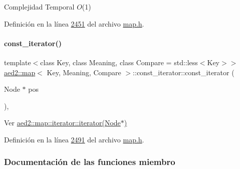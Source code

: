 \begin{DoxyDescription}
\item[Complejidad Temporal]$O$(1)
\end{DoxyDescription}

Definición en la línea \hyperlink{map_8h_source_l02451}{2451} del archivo \hyperlink{map_8h_source}{map.\+h}.

\mbox{\label{classaed2_1_1map_1_1const__iterator_a195d395708167dca23f9ce49f7c604f3_a195d395708167dca23f9ce49f7c604f3}} 
\paragraph{\texorpdfstring{const\+\_\+iterator()}{const\_iterator()}\hspace{0.1cm}{\footnotesize\ttfamily [3/3]}}
{\footnotesize\ttfamily template$<$class Key, class Meaning, class Compare = std\+::less$<$\+Key$>$$>$ \\
\hyperlink{classaed2_1_1map}{aed2\+::map}$<$ Key, Meaning, Compare $>$\+::const\+\_\+iterator\+::const\+\_\+iterator (\begin{DoxyParamCaption}\item[{Node $\ast$}]{pos }\end{DoxyParamCaption})\hspace{0.3cm}{\ttfamily [inline]}, {\ttfamily [private]}}



Ver \hyperlink{classaed2_1_1map_1_1iterator_ab0ea21abcb32b6d5a72cf341b9029838_ab0ea21abcb32b6d5a72cf341b9029838}{aed2\+::map\+::iterator\+::iterator(\+Node$\ast$)} 



Definición en la línea \hyperlink{map_8h_source_l02491}{2491} del archivo \hyperlink{map_8h_source}{map.\+h}.



\subsubsection{Documentación de las funciones miembro}
\mbox{\label{classaed2_1_1map_1_1const__iterator_a174e7b81e88253d936fb14512f00ef69_a174e7b81e88253d936fb14512f00ef69}} 
